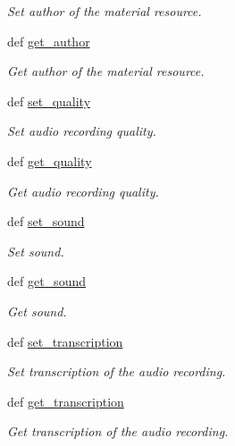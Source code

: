 \begin{DoxyCompactItemize}
\begin{DoxyCompactList}\small\item\em Set author of the material resource. \end{DoxyCompactList}\item 
def \hyperlink{classlmf_1_1src_1_1resources_1_1audio_1_1_audio_ae743d78a0d4dbfbabc4ad7523465078b}{get\+\_\+author}
\begin{DoxyCompactList}\small\item\em Get author of the material resource. \end{DoxyCompactList}\item 
def \hyperlink{classlmf_1_1src_1_1resources_1_1audio_1_1_audio_a08861860dac77a0b66ba7dbce79efbf2}{set\+\_\+quality}
\begin{DoxyCompactList}\small\item\em Set audio recording quality. \end{DoxyCompactList}\item 
def \hyperlink{classlmf_1_1src_1_1resources_1_1audio_1_1_audio_af902a144510d0de3c4fdb27e1647bc5d}{get\+\_\+quality}
\begin{DoxyCompactList}\small\item\em Get audio recording quality. \end{DoxyCompactList}\item 
def \hyperlink{classlmf_1_1src_1_1resources_1_1audio_1_1_audio_a7f040faf7aa3186395b37045927b3873}{set\+\_\+sound}
\begin{DoxyCompactList}\small\item\em Set sound. \end{DoxyCompactList}\item 
def \hyperlink{classlmf_1_1src_1_1resources_1_1audio_1_1_audio_a48601a0fc78df20137752ba75d93afa2}{get\+\_\+sound}
\begin{DoxyCompactList}\small\item\em Get sound. \end{DoxyCompactList}\item 
def \hyperlink{classlmf_1_1src_1_1resources_1_1audio_1_1_audio_ae1607052262aea48ea7718e194bf42c3}{set\+\_\+transcription}
\begin{DoxyCompactList}\small\item\em Set transcription of the audio recording. \end{DoxyCompactList}\item 
def \hyperlink{classlmf_1_1src_1_1resources_1_1audio_1_1_audio_a25989c45a639560b83846433ad1c2504}{get\+\_\+transcription}
\begin{DoxyCompactList}\small\item\em Get transcription of the audio recording. \end{DoxyCompactList}\item 

\end{DoxyCompactItemize}
